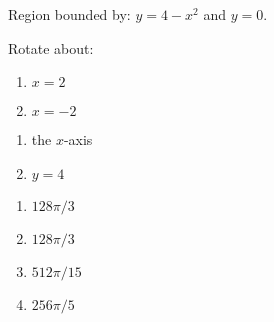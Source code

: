 {Region bounded by: $y=4-x^2$ and $y=0$.

Rotate about:

\noindent%
\begin{minipage}[t]{.5\linewidth}
\begin{enumerate}
\item		$x=2$
\item		$x=-2$
\end{enumerate}
\end{minipage}
\begin{minipage}[t]{.5\linewidth}
\begin{enumerate}\addtocounter{enumii}{2}
\item		the $x$-axis
\item		$y=4$
\end{enumerate}
\end{minipage}
}
{\begin{enumerate}
\item $128\pi/3$
\item $128\pi/3$
\item $512\pi/15$
\item $256\pi/5$
\end{enumerate}
}
